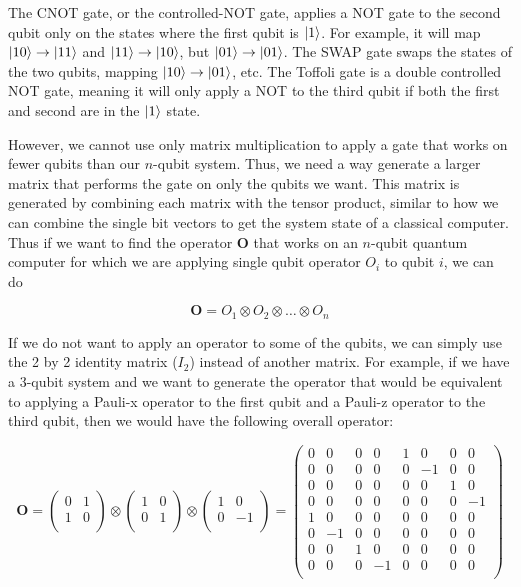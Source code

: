 \documentclass[11pt]{report}
\newcommand{\?}{\stackrel{?}{=}}
\begin{document}
The CNOT gate, or the controlled-NOT gate, applies a NOT gate to the second qubit only on the states where the first qubit is $\ket{1}$. For example, it will map $\ket{10} \to \ket{11}$ and $\ket{11} \to \ket{10}$, but $\ket{01} \to \ket{01}$. The SWAP gate swaps the states of the two qubits, mapping $\ket{10} \to \ket{01}$, etc. The Toffoli gate is a double controlled NOT gate, meaning it will only apply a NOT to the third qubit if both the first and second are in the $\ket{1}$ state.

However, we cannot use only matrix multiplication to apply a gate that works on fewer qubits than our $n$-qubit system. Thus, we need a way generate a larger matrix that performs the gate on only the qubits we want. This matrix is generated by combining each matrix with the tensor product, similar to how we can combine the single bit vectors to get the system state of a classical computer. Thus if we want to find the operator $\mathbf{O}$ that works on an $n$-qubit quantum computer for which we are applying single qubit operator $O_i$ to qubit $i$, we can do

$$\mathbf{O} = O_1 \otimes O_2 \otimes \ldots \otimes O_n$$

If we do not want to apply an operator to some of the qubits, we can simply use the 2 by 2 identity matrix ($I_2$) instead of another matrix. For example, if we have a 3-qubit system and we want to generate the operator that would be equivalent to applying a Pauli-x operator to the first qubit and a Pauli-z operator to the third qubit, then we would have the following overall operator:

$$\mathbf{O} = \begin{pmatrix}0 & 1 \\1 & 0 \\\end{pmatrix} \otimes \begin{pmatrix}1 & 0 \\0 & 1 \\\end{pmatrix} \otimes \begin{pmatrix}1 & 0 \\0 & -1 \\\end{pmatrix} = \begin{pmatrix}
0 & 0 & 0 & 0 & 1 & 0 & 0 & 0 \\
0 & 0 & 0 & 0 & 0 & -1 & 0 & 0 \\
0 & 0 & 0 & 0 & 0 & 0 & 1 & 0 \\
0 & 0 & 0 & 0 & 0 & 0 & 0 & -1 \\
1 & 0 & 0 & 0 & 0 & 0 & 0 & 0 \\
0 & -1 & 0 & 0 & 0 & 0 & 0 & 0 \\
0 & 0 & 1 & 0 & 0 & 0 & 0 & 0 \\
0 & 0 & 0 & -1 & 0 & 0 & 0 & 0 \\
\end{pmatrix}$$
\end{document}
